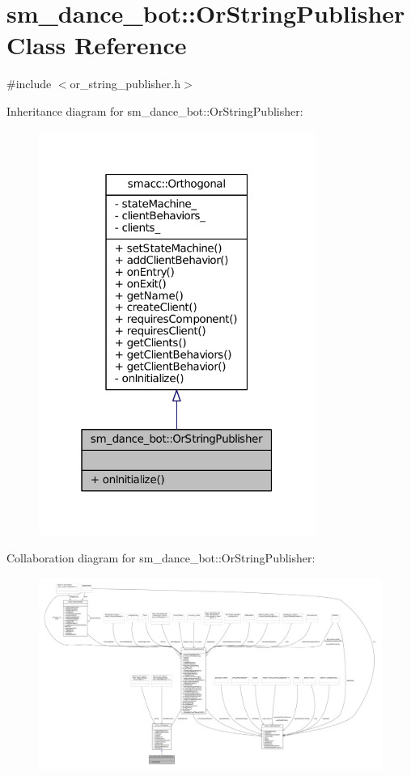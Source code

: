\hypertarget{classsm__dance__bot_1_1OrStringPublisher}{}\section{sm\+\_\+dance\+\_\+bot\+:\+:Or\+String\+Publisher Class Reference}
\label{classsm__dance__bot_1_1OrStringPublisher}


{\ttfamily \#include $<$or\+\_\+string\+\_\+publisher.\+h$>$}



Inheritance diagram for sm\+\_\+dance\+\_\+bot\+:\+:Or\+String\+Publisher\+:
\nopagebreak
\begin{figure}[H]
\begin{center}
\leavevmode
\includegraphics[width=256pt]{classsm__dance__bot_1_1OrStringPublisher__inherit__graph}
\end{center}
\end{figure}


Collaboration diagram for sm\+\_\+dance\+\_\+bot\+:\+:Or\+String\+Publisher\+:
\nopagebreak
\begin{figure}[H]
\begin{center}
\leavevmode
\includegraphics[width=350pt]{classsm__dance__bot_1_1OrStringPublisher__coll__graph}
\end{center}
\end{figure}
